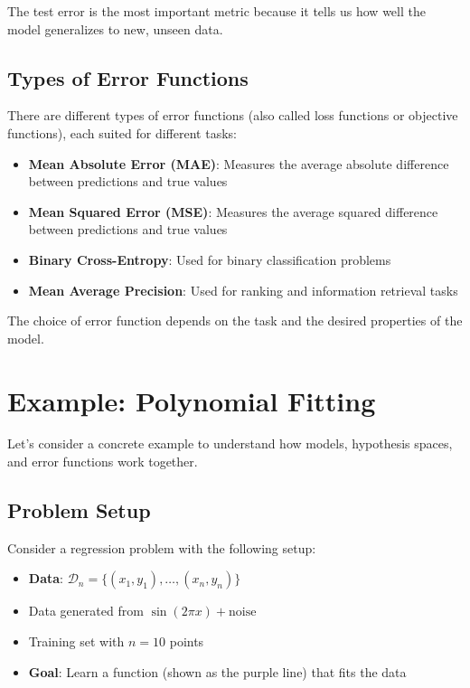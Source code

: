 \documentclass[11pt,a4paper]{article}
\theoremstyle{definition}
\theoremstyle{plain}
\theoremstyle{remark}
\begin{document}
The test error is the most important metric because it tells us how well the model generalizes to new, unseen data.

\subsection{Types of Error Functions}

There are different types of error functions (also called loss functions or objective functions), each suited for different tasks:

\begin{itemize}
    \item \textbf{Mean Absolute Error (MAE)}: Measures the average absolute difference between predictions and true values
    \item \textbf{Mean Squared Error (MSE)}: Measures the average squared difference between predictions and true values
    \item \textbf{Binary Cross-Entropy}: Used for binary classification problems
    \item \textbf{Mean Average Precision}: Used for ranking and information retrieval tasks
\end{itemize}

The choice of error function depends on the task and the desired properties of the model.

\section{Example: Polynomial Fitting}

Let's consider a concrete example to understand how models, hypothesis spaces, and error functions work together.

\subsection{Problem Setup}

Consider a regression problem with the following setup:
\begin{itemize}
    \item \textbf{Data}: $\mathcal{D}_n = \{(x_1, y_1), \ldots, (x_n, y_n)\}$
    \item Data generated from $\sin(2\pi x) + \text{noise}$
    \item Training set with $n = 10$ points
    \item \textbf{Goal}: Learn a function (shown as the purple line) that fits the data
\end{itemize}
\end{document}

